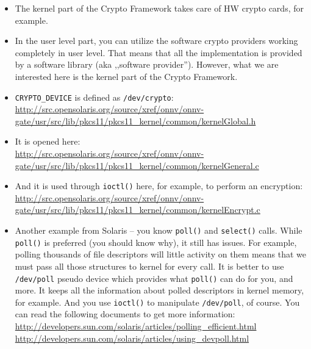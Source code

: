 \begin{itemize}
\item The kernel part of the Crypto Framework takes care of HW crypto cards, for
example.
\item In the user level part, you can utilize the software crypto providers
working completely in user level. That means that all the implementation is
provided by a software library (aka ,,software provider''). However, what we are
interested here is the kernel part of the Crypto Framework.
\item \texttt{CRYPTO\_DEVICE} is defined as \texttt{/dev/crypto}:\\
\url{http://src.opensolaris.org/source/xref/onnv/onnv-gate/usr/src/lib/pkcs11/pkcs11\_kernel/common/kernelGlobal.h}
\item It is opened here:\\
\url{http://src.opensolaris.org/source/xref/onnv/onnv-gate/usr/src/lib/pkcs11/pkcs11\_kernel/common/kernelGeneral.c}
\item And it is used through \texttt{ioctl()} here, for example, to perform an
encryption:\\
\url{http://src.opensolaris.org/source/xref/onnv/onnv-gate/usr/src/lib/pkcs11/pkcs11\_kernel/common/kernelEncrypt.c}
\item \label{DEV_POLL} Another example from Solaris -- you know \texttt{poll()}
and \texttt{select()} calls. While \texttt{poll()} is preferred (you should know
why), it still has issues. For example, polling thousands of file descriptors
will little activity on them means that we must pass all those structures to
kernel for every call. It is better to use \texttt{/dev/poll} pseudo device
which provides what \texttt{poll()} can do for you, and more. It keeps all the
information about polled descriptors in kernel memory, for example. And you use
\texttt{ioctl()} to manipulate \texttt{/dev/poll}, of course. You can read the
following documents to get more information:\\
\url{http://developers.sun.com/solaris/articles/polling\_efficient.html}\\
\url{http://developers.sun.com/solaris/articles/using\_devpoll.html}
\end{itemize}

